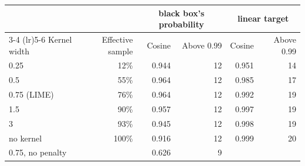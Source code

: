 \begin{tabular}{@{}lrrrrr@{}}
  \toprule
   &  & \multicolumn{2}{c}{black box's probability} & \multicolumn{2}{c}{linear target} \\
  \cmidrule(lr){3-4} \cmidrule(lr){5-6}
  Kernel width & Effective sample & Cosine & Above 0.99 & Cosine & Above 0.99 \\
  \midrule
  0.25 & 12\% & 0.944 & 12 & 0.951 & 14 \\
  0.5 & 55\% & 0.964 & 12 & 0.985 & 17 \\
  0.75 (LIME) & 76\% & 0.964 & 12 & 0.992 & 19 \\
  1.5 & 90\% & 0.957 & 12 & 0.997 & 19 \\
  3 & 93\% & 0.945 & 12 & 0.998 & 19 \\
  no kernel & 100\% & 0.916 & 12 & 0.999 & 20 \\
  \midrule
  0.75, no penalty &  & 0.626 & 9 &  &  \\
  \bottomrule
\end{tabular}
